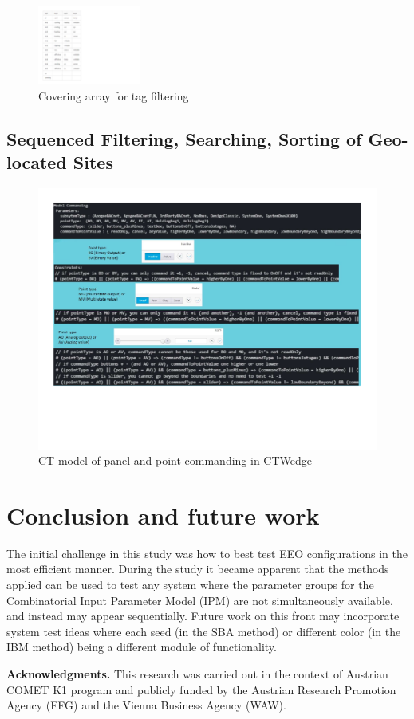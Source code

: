 \documentclass[conference]{IEEEtran}
\begin{document}
	
	\begin{figure}[!h]
		\includegraphics[width=0.30\textwidth,]{tagFilterCoveringArray.pdf}
		\caption{Covering array for tag filtering}
		\label{fig:tagFilterCoveringArray}
	\end{figure}

	\subsection{Sequenced Filtering, Searching, Sorting of Geo-located Sites}
	
	\begin{figure}[!ht]
		\centering
			\includegraphics[width=1.05\textwidth,]{modelCommanding.pdf}
			\caption{CT model of panel and point commanding in CTWedge}
			\label{fig:modelCommanding}
	\end{figure}

\section{Conclusion and future work}
	
The initial challenge in this study was how to best test EEO configurations in the most efficient manner.
During the study it became apparent that the methods applied can be used to test any system where the parameter groups for
the Combinatorial Input Parameter Model (IPM) are not simultaneously available, and instead may appear sequentially.
Future work on this front may incorporate system test ideas where each seed (in the SBA method) or different color (in the IBM method) being a different module of functionality.

\textbf{Acknowledgments.}
This research was carried out in the context of Austrian COMET K1
program and publicly funded by the Austrian Research Promotion Agency
(FFG) and the Vienna Business Agency (WAW).



\end{document}
